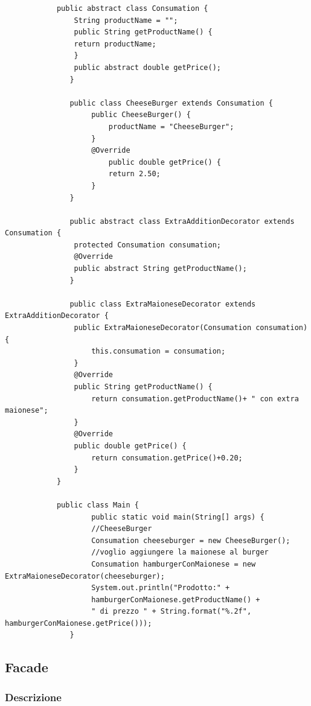 \documentclass[a4paper,10pt]{article}
\begin{document}
        \begin{lstlisting}
            public abstract class Consumation {
                String productName = "";
                public String getProductName() {
                return productName;
                }
                public abstract double getPrice();
               }

               public class CheeseBurger extends Consumation {
                    public CheeseBurger() {
                        productName = "CheeseBurger";
                    }
                    @Override
                        public double getPrice() {
                        return 2.50;
                    }
               }

               public abstract class ExtraAdditionDecorator extends Consumation {
                protected Consumation consumation;
                @Override
                public abstract String getProductName();
               }

               public class ExtraMaioneseDecorator extends ExtraAdditionDecorator {
                public ExtraMaioneseDecorator(Consumation consumation){
                    this.consumation = consumation;
                }
                @Override
                public String getProductName() {
                    return consumation.getProductName()+ " con extra maionese";
                }
                @Override
                public double getPrice() {
                    return consumation.getPrice()+0.20;
                }
            }

            public class Main {
                    public static void main(String[] args) {
                    //CheeseBurger
                    Consumation cheeseburger = new CheeseBurger();
                    //voglio aggiungere la maionese al burger
                    Consumation hamburgerConMaionese = new ExtraMaioneseDecorator(cheeseburger);
                    System.out.println("Prodotto:" +
                    hamburgerConMaionese.getProductName() +
                    " di prezzo " + String.format("%.2f", hamburgerConMaionese.getPrice()));
               }
        \end{lstlisting}

        \newpage

        \subsection{Facade}
        \subsubsection{Descrizione}
\end{document}
